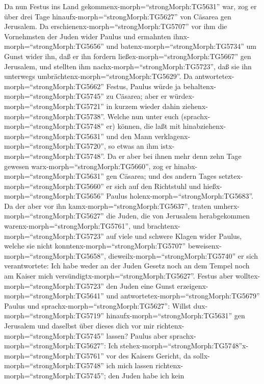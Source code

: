  Da nun Festus ins Land
gekommenx-morph=``strongMorph:TG5631'' war, zog er über drei Tage
hinaufx-morph=``strongMorph:TG5627'' von Cäsarea gen Jerusalem.
 Da erschienenx-morph=``strongMorph:TG5707'' vor ihm die
Vornehmsten der Juden wider Paulus und ermahnten
ihnx-morph=``strongMorph:TG5656''  und
batenx-morph=``strongMorph:TG5734'' um Gunst wider ihn, daß er ihn
fordern ließex-morph=``strongMorph:TG5667'' gen Jerusalem, und stellten
ihm nachx-morph=``strongMorph:TG5723'', daß sie ihn unterwegs
umbrächtenx-morph=``strongMorph:TG5629''.  Da
antwortetex-morph=``strongMorph:TG5662'' Festus, Paulus würde ja
behaltenx-morph=``strongMorph:TG5745'' zu Cäsarea; aber er
würdex-morph=``strongMorph:TG5721'' in kurzem wieder dahin
ziehenx-morph=``strongMorph:TG5738''.  Welche nun unter euch
(sprachx-morph=``strongMorph:TG5748'' er) können, die laßt mit
hinabziehenx-morph=``strongMorph:TG5631'' und den Mann
verklagenx-morph=``strongMorph:TG5720'', so etwas an ihm
istx-morph=``strongMorph:TG5748''.  Da er aber bei ihnen
mehr denn zehn Tage gewesen warx-morph=``strongMorph:TG5660'', zog er
hinabx-morph=``strongMorph:TG5631'' gen Cäsarea; und des andern Tages
setztex-morph=``strongMorph:TG5660'' er sich auf den Richtstuhl und
hießx-morph=``strongMorph:TG5656'' Paulus
holenx-morph=``strongMorph:TG5683''.  Da der aber vor ihn
kamx-morph=``strongMorph:TG5637'', traten
umherx-morph=``strongMorph:TG5627'' die Juden, die von Jerusalem
herabgekommen warenx-morph=``strongMorph:TG5761'', und
brachtenx-morph=``strongMorph:TG5723'' auf viele und schwere Klagen
wider Paulus, welche sie nicht konntenx-morph=``strongMorph:TG5707''
beweisenx-morph=``strongMorph:TG5658'', 
dieweilx-morph=``strongMorph:TG5740'' er sich verantwortete: Ich habe
weder an der Juden Gesetz noch an dem Tempel noch am Kaiser mich
versündigtx-morph=``strongMorph:TG5627''.  Festus aber
wolltex-morph=``strongMorph:TG5723'' den Juden eine Gunst
erzeigenx-morph=``strongMorph:TG5641'' und
antwortetex-morph=``strongMorph:TG5679'' Paulus und
sprachx-morph=``strongMorph:TG5627'': Willst
dux-morph=``strongMorph:TG5719'' hinaufx-morph=``strongMorph:TG5631''
gen Jerusalem und daselbst über dieses dich vor mir
richtenx-morph=``strongMorph:TG5745'' lassen?  Paulus aber
sprachx-morph=``strongMorph:TG5627'': Ich
stehex-morph=``strongMorph:TG5748''x-morph=``strongMorph:TG5761'' vor
des Kaisers Gericht, da sollx-morph=``strongMorph:TG5748'' ich mich
lassen richtenx-morph=``strongMorph:TG5745''; den Juden habe ich kein
